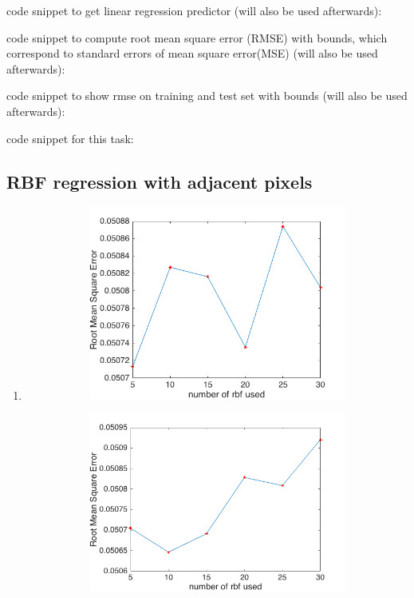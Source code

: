 \documentclass{article}
\begin{document}
\begin{enumerate}[label=(\alph*)]
					code snippet to get linear regression predictor (will also be used afterwards):
					 
					code snippet to compute root mean square error (RMSE) with bounds, which correspond to standard errors of mean square error(MSE)  (will also be used  afterwards):
					
					code snippet to show rmse on training and test set with bounds (will also be used  afterwards):
					
					code snippet for this task:
					
			\end{enumerate}
		\subsection{RBF regression with adjacent pixels}
			\begin{enumerate}[label=(\alph*)]
				\item
				 	\begin{figure}[t]
				 		\caption{Root Mean Square Error against number of radial basis functions used}
				 		\begin{subfigure}{0.5\textwidth}
				 			\includegraphics[width=\linewidth]{images/p1-3-a_5_30.png}
				 			\caption{}
				 			\label{fig:p-1-3-a_a}
			 			\end{subfigure}
				 		\begin{subfigure}{0.5\textwidth}
				 			\includegraphics[width=\linewidth]{images/p1-3-a_5_30_another.png}

\end{subfigure}
\end{figure}
\end{enumerate}
\end{document}
